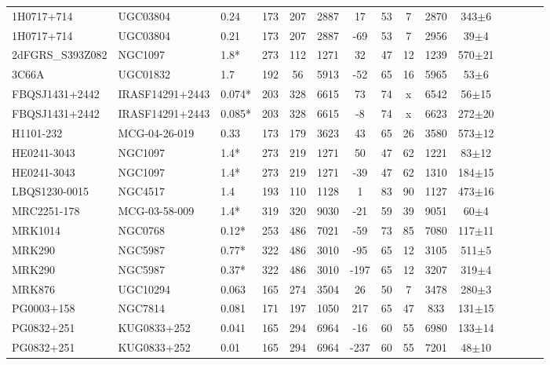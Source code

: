 \documentclass[iop]{emulateapj-rtx4}
\begin{document}
\begin{table}[ht]
\begin{center}
\begin{tabular}{l l l c c c c c c c c c c c c}
1H0717+714  &  UGC03804  &  0.24  &  173  &  207  &  2887  &  17  &  53  &  7  &  2870  &  343$\pm$6  \\
1H0717+714  &  UGC03804  &  0.21  &  173  &  207  &  2887  &  -69  &  53  &  7  &  2956  &  39$\pm$4  \\
2dFGRS\_S393Z082  &  NGC1097  &  1.8*  &  273  &  112  &  1271  &  32  &  47  &  12  &  1239  &  570$\pm$21  \\
3C66A  &  UGC01832  &  1.7  &  192  &  56  &  5913  &  -52  &  65  &  16  &  5965  &  53$\pm$6  \\
FBQSJ1431+2442  &  IRASF14291+2443  &  0.074*  &  203  &  328  &  6615  &  73  &  74  &  x  &  6542  &  56$\pm$15  \\
FBQSJ1431+2442  &  IRASF14291+2443  &  0.085*  &  203  &  328  &  6615  &  -8  &  74  &  x  &  6623  &  272$\pm$20  \\
H1101-232  &  MCG-04-26-019  &  0.33  &  173  &  179  &  3623  &  43  &  65  &  26  &  3580  &  573$\pm$12  \\
HE0241-3043  &  NGC1097  &  1.4*  &  273  &  219  &  1271  &  50  &  47  &  62  &  1221  &  83$\pm$12  \\
HE0241-3043  &  NGC1097  &  1.4*  &  273  &  219  &  1271  &  -39  &  47  &  62  &  1310  &  184$\pm$15  \\
LBQS1230-0015  &  NGC4517  &  1.4  &  193  &  110  &  1128  &  1  &  83  &  90  &  1127  &  473$\pm$16  \\
MRC2251-178  &  MCG-03-58-009  &  1.4*  &  319  &  320  &  9030  &  -21  &  59  &  39  &  9051  &  60$\pm$4  \\
MRK1014  &  NGC0768  &  0.12*  &  253  &  486  &  7021  &  -59  &  73  &  85  &  7080  &  117$\pm$11  \\
MRK290  &  NGC5987  &  0.77*  &  322  &  486  &  3010  &  -95  &  65  &  12  &  3105  &  511$\pm$5  \\
MRK290  &  NGC5987  &  0.37*  &  322  &  486  &  3010  &  -197  &  65  &  12  &  3207  &  319$\pm$4  \\
MRK876  &  UGC10294  &  0.063  &  165  &  274  &  3504  &  26  &  50  &  7  &  3478  &  280$\pm$3  \\
PG0003+158  &  NGC7814  &  0.081  &  171  &  197  &  1050  &  217  &  65  &  47  &  833  &  131$\pm$15  \\
PG0832+251  &  KUG0833+252  &  0.041  &  165  &  294  &  6964  &  -16  &  60  &  55  &  6980  &  133$\pm$14  \\
PG0832+251  &  KUG0833+252  &  0.01  &  165  &  294  &  6964  &  -237  &  60  &  55  &  7201  &  48$\pm$10  \\

\end{tabular}
\end{center}
\end{table}
\end{document}
